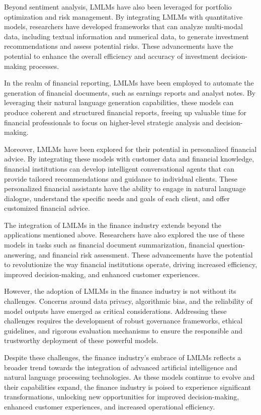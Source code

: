 \documentclass[11pt]{article}
\begin{document}
Beyond sentiment analysis, LMLMs have also been leveraged for portfolio optimization and risk management. By integrating LMLMs with quantitative models, researchers have developed frameworks that can analyze multi-modal data, including textual information and numerical data, to generate investment recommendations and assess potential risks. \cite{ref201} These advancements have the potential to enhance the overall efficiency and accuracy of investment decision-making processes.

In the realm of financial reporting, LMLMs have been employed to automate the generation of financial documents, such as earnings reports and analyst notes. \cite{ref202} By leveraging their natural language generation capabilities, these models can produce coherent and structured financial reports, freeing up valuable time for financial professionals to focus on higher-level strategic analysis and decision-making.

Moreover, LMLMs have been explored for their potential in personalized financial advice. By integrating these models with customer data and financial knowledge, financial institutions can develop intelligent conversational agents that can provide tailored recommendations and guidance to individual clients. \cite{ref203} These personalized financial assistants have the ability to engage in natural language dialogue, understand the specific needs and goals of each client, and offer customized financial advice.

The integration of LMLMs in the finance industry extends beyond the applications mentioned above. Researchers have also explored the use of these models in tasks such as financial document summarization, financial question-answering, and financial risk assessment. \cite{ref204} These advancements have the potential to revolutionize the way financial institutions operate, driving increased efficiency, improved decision-making, and enhanced customer experiences.

However, the adoption of LMLMs in the finance industry is not without its challenges. Concerns around data privacy, algorithmic bias, and the reliability of model outputs have emerged as critical considerations. \cite{ref205} Addressing these challenges requires the development of robust governance frameworks, ethical guidelines, and rigorous evaluation mechanisms to ensure the responsible and trustworthy deployment of these powerful models.

Despite these challenges, the finance industry's embrace of LMLMs reflects a broader trend towards the integration of advanced artificial intelligence and natural language processing technologies. As these models continue to evolve and their capabilities expand, the finance industry is poised to experience significant transformations, unlocking new opportunities for improved decision-making, enhanced customer experiences, and increased operational efficiency.
\end{document}
